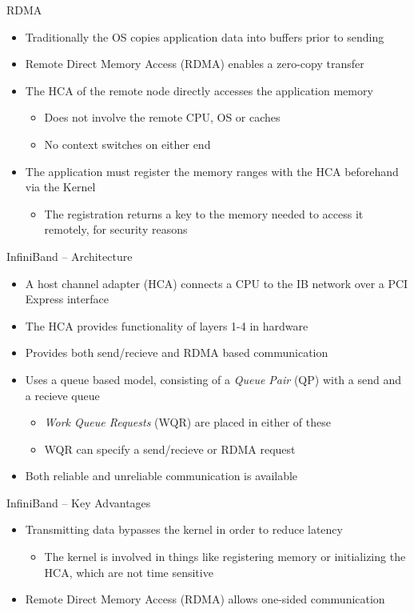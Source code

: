 \documentclass{beamer}
\begin{document}
\begin{frame}{RDMA}
	\begin{itemize}
		\item Traditionally the OS copies application data into buffers prior to sending
		\item Remote Direct Memory Access (RDMA) enables a zero-copy transfer
		\item The HCA of the remote node directly accesses the application memory
		\begin{itemize}	
			\item Does not involve the remote CPU, OS or caches
			\item No context switches on either end
		\end{itemize}
		\item The application must register the memory ranges with the HCA beforehand via the Kernel
		\begin{itemize}	
			\item The registration returns a key to the memory needed to access it remotely, for security reasons
		\end{itemize}
		
	\end{itemize}
\end{frame}

\begin{frame}{InfiniBand – Architecture}
\begin{itemize}
	\item A host channel adapter (HCA) connects a CPU to the IB network over a PCI Express interface
	\item The HCA provides functionality of layers 1-4 in hardware
	\item Provides both send/recieve and RDMA based communication
	\item Uses a queue based model, consisting of a \textit{Queue Pair} (QP) with a send and a recieve queue
	\begin{itemize}	
		\item \textit{Work Queue Requests} (WQR) are placed in either of these
		\item WQR can specify a send/recieve or RDMA request
	\end{itemize}
	\item Both reliable and unreliable communication is available
\end{itemize}
\end{frame}

\begin{frame}{InfiniBand – Key Advantages}
\begin{itemize}
	\item Transmitting data bypasses the kernel in order to reduce latency
	\begin{itemize}	
		\item The kernel is involved in things like registering memory or initializing the HCA, which are not time sensitive
	\end{itemize}
	\item Remote Direct Memory Access (RDMA) allows one-sided communication
\end{itemize}
\end{frame}
\end{document}
